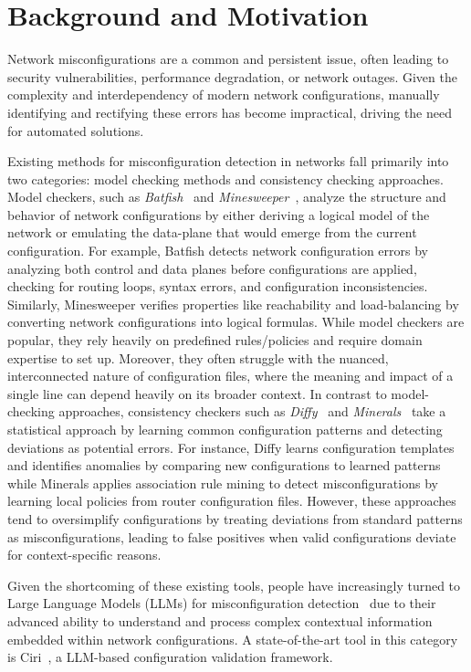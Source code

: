 \section{Background and Motivation}
\label{sec_background}
Network misconfigurations are a common and persistent issue, often leading to security vulnerabilities, performance degradation, or network outages. Given the complexity and interdependency of modern network configurations, manually identifying and rectifying these errors has become impractical, driving the need for automated solutions.

Existing methods for misconfiguration detection in networks fall primarily into two categories: model checking methods and consistency checking approaches. Model checkers, such as \textit{Batfish}~\cite{fogel2015general} and \textit{Minesweeper}~\cite{beckett2017general}, analyze the structure and behavior of network configurations by either deriving a logical model of the network or emulating the data-plane that would emerge from the current configuration.
For example, Batfish detects network configuration errors by analyzing both control and data planes before configurations are applied, checking for routing loops, syntax errors, and configuration inconsistencies. Similarly, Minesweeper verifies properties like reachability and load-balancing by converting network configurations into logical formulas. While model checkers are popular, they rely heavily on predefined rules/policies and require domain expertise to set up. Moreover, they often struggle with the nuanced, interconnected nature of configuration files, where the meaning and impact of a single line can depend heavily on its broader context.
In contrast to model-checking approaches, consistency checkers such as \textit{Diffy}~\cite{kakarla2024diffy} and \textit{Minerals}~\cite{le2006minerals} take a statistical approach by learning common configuration patterns and detecting deviations as potential errors.
For instance, Diffy learns configuration templates and identifies anomalies by comparing new configurations to learned patterns while Minerals applies association rule mining to detect misconfigurations by learning local policies from router configuration files. However, these approaches tend to oversimplify configurations by treating deviations from standard patterns as misconfigurations, leading to false positives when valid configurations deviate for context-specific reasons.


Given the shortcoming of these existing tools,
people have increasingly turned to Large Language Models (LLMs) for misconfiguration detection~\cite{bogdanov2024leveraging,chen2024automatic,wang2024identifying,liu2024large, wang2024netconfeval} due to their advanced ability to understand and process complex contextual information embedded within network configurations. A state-of-the-art tool in this category is Ciri~\cite{lian2023configuration}, a LLM-based configuration validation framework.

